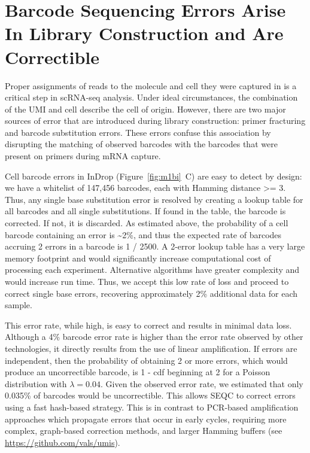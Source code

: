 \section{Barcode Sequencing Errors Arise In Library Construction and Are Correctible} 

Proper assignments of reads to the molecule and cell they were captured in is a critical step in scRNA-seq analysis. 
Under ideal circumstances, the combination of the UMI and cell describe the cell of origin. 
However, there are two major sources of error that are introduced during library construction: primer fracturing and barcode substitution errors. 
These errors confuse this association by disrupting the matching of observed barcodes with the barcodes that were present on primers during mRNA capture. 

Cell barcode errors in InDrop (Figure~\ref{fig:m1bi}~C) are easy to detect by design: we have a whitelist of 147,456 barcodes, each with Hamming distance \textgreater{}= 3. 
Thus, any single base substitution error is resolved by creating a lookup table for all barcodes and all single substitutions. 
If found in the table, the barcode is corrected.  
If not, it is discarded. 
As estimated above, the probability of a cell barcode containing an error is \textasciitilde{}2\%, and thus the expected rate of barcodes accruing 2 errors in a barcode is 1 / 2500. 
A 2-error lookup table has a very large memory footprint and would significantly increase computational cost of processing each experiment.  
Alternative algorithms have greater complexity and would increase run time. 
Thus, we accept this low rate of loss and proceed to correct single base errors, recovering approximately 2\% additional data for each sample.  

This error rate, while high, is easy to correct and results in minimal data loss. 
Although a 4\% barcode error rate is higher than the error rate observed by other technologies, it directly results from the use of linear amplification. 
If errors are independent, then the probability of obtaining 2 or more errors, which would produce an uncorrectible barcode,  is 1 - cdf beginning at 2 for a Poisson distribution with $\lambda = 0.04$. 
Given the observed error rate, we estimated that only 0.035\% of barcodes would be uncorrectible.
This allows SEQC to correct errors using a fast hash-based strategy. 
This is in contrast to PCR-based amplification approaches which propagate errors that occur in early cycles, requiring more complex, graph-based correction methods, and larger Hamming buffers (see \href{https://github.com/vals/umis}{https://github.com/vals/umis}).

